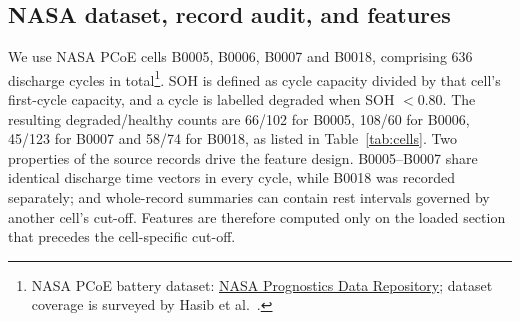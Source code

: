 \documentclass[final,5p,times,twocolumn]{elsarticle}
\begin{document}
\subsection{NASA dataset, record audit, and features}
We use NASA PCoE cells B0005, B0006, B0007 and B0018, comprising 636 discharge cycles in total\footnote{NASA PCoE battery dataset: \href{https://www.nasa.gov/intelligent-systems-division/discovery-and-systems-health/pcoe/pcoe-data-set-repository/}{NASA Prognostics Data Repository}; dataset coverage is surveyed by Hasib et al.~\cite{hasib2021}.}. SOH is defined as cycle capacity divided by that cell's first-cycle capacity, and a cycle is labelled degraded when SOH $<0.80$. The resulting degraded/healthy counts are 66/102 for B0005, 108/60 for B0006, 45/123 for B0007 and 58/74 for B0018, as listed in Table~\ref{tab:cells}. Two properties of the source records drive the feature design. B0005--B0007 share identical discharge time vectors in every cycle, while B0018 was recorded separately; and whole-record summaries can contain rest intervals governed by another cell's cut-off. Features are therefore computed only on the loaded section that precedes the cell-specific cut-off.
\end{document}
